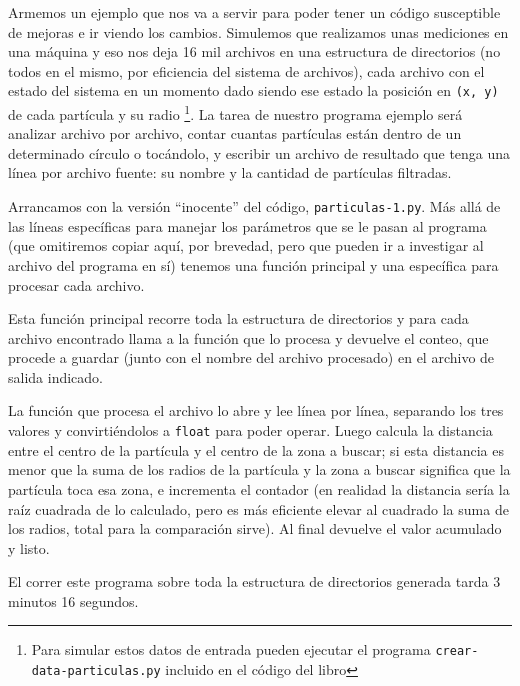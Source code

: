 Armemos un ejemplo que nos va a servir para poder tener un código susceptible de mejoras e ir viendo los cambios. Simulemos que realizamos unas mediciones en una máquina y eso nos deja 16 mil archivos en una estructura de directorios (no todos en el mismo, por eficiencia del sistema de archivos), cada archivo con el estado del sistema en un momento dado siendo ese estado la posición en \texttt{(x, y)} de cada partícula y su radio \footnote{Para simular estos datos de entrada pueden ejecutar el programa \texttt{crear-data-particulas.py} incluido en el código del libro}. La tarea de nuestro programa ejemplo será analizar archivo por archivo, contar cuantas partículas están dentro de un determinado círculo o tocándolo, y escribir un archivo de resultado que tenga una línea por archivo fuente: su nombre y la cantidad de partículas filtradas.

Arrancamos con la versión ``inocente'' del código, \texttt{particulas-1.py}. Más allá de las líneas específicas para manejar los parámetros que se le pasan al programa (que omitiremos copiar aquí, por brevedad, pero que pueden ir a investigar al archivo del programa en sí) tenemos una función principal y una específica para procesar cada archivo.


Esta función principal recorre toda la estructura de directorios y para cada archivo encontrado llama a la función que lo procesa y devuelve el conteo, que procede a guardar (junto con el nombre del archivo procesado) en el archivo de salida indicado.


La función que procesa el archivo lo abre y lee línea por línea, separando los tres valores y convirtiéndolos a \texttt{float} para poder operar. Luego calcula la distancia entre el centro de la partícula y el centro de la zona a buscar; si esta distancia es menor que la suma de los radios de la partícula y la zona a buscar significa que la partícula toca esa zona, e incrementa el contador (en realidad la distancia sería la raíz cuadrada de lo calculado, pero es más eficiente elevar al cuadrado la suma de los radios, total para la comparación sirve). Al final devuelve el valor acumulado y listo.

El correr este programa sobre toda la estructura de directorios generada tarda 3 minutos 16 segundos.



